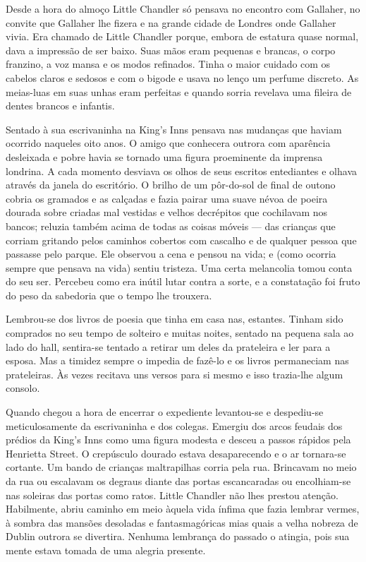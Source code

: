Desde a hora do almoço Little Chandler só pensava no encontro com
Gallaher, no convite que Gallaher lhe fizera e na grande cidade de
Londres onde Gallaher vivia. Era chamado de Little Chandler porque,
embora de estatura quase normal, dava a impressão de ser baixo. Suas
mãos eram pequenas e brancas, o corpo franzino, a voz mansa e os modos
refinados. Tinha o maior cuidado com os cabelos claros e sedosos e com
o bigode e usava no lenço um perfume discreto. As meias-luas em suas
unhas eram perfeitas e quando sorria revelava uma fileira de dentes
brancos e infantis.

Sentado à sua escrivaninha na King's Inns pensava nas mudanças que
haviam ocorrido naqueles oito anos. O amigo que conhecera outrora com
aparência desleixada e pobre havia se
tornado uma figura proeminente da imprensa londrina. A cada momento
desviava os olhos de seus escritos entediantes e olhava através da
janela do escritório. O brilho de um pôr-do-sol de final de outono
cobria os gramados e as calçadas e fazia pairar uma suave névoa de
poeira dourada sobre criadas mal vestidas e velhos decrépitos que
cochilavam nos bancos; reluzia também acima de todas as coisas móveis
--- das crianças que corriam gritando pelos caminhos cobertos com
cascalho e de qualquer pessoa que passasse pelo parque. Ele observou a
cena e pensou na vida; e (como ocorria sempre que pensava na vida)
sentiu tristeza. Uma certa melancolia tomou conta do seu ser. Percebeu
como era inútil lutar contra a sorte, e a constatação foi fruto do
peso da sabedoria que o tempo lhe trouxera.

Lembrou-se dos livros de poesia que tinha em casa nas, estantes.
Tinham sido comprados no seu tempo de solteiro e muitas noites,
sentado na pequena sala ao lado do hall, sentira-se tentado a
retirar um deles da prateleira e ler para a esposa. Mas a timidez
sempre o impedia de fazê-lo e os livros permaneciam nas prateleiras.
Às vezes recitava uns versos para si mesmo e isso trazia-lhe algum
consolo.

Quando chegou a hora de encerrar o expediente levantou-se e
despediu-se meticulosamente da escrivaninha e dos colegas. Emergiu dos
arcos feudais dos prédios da King's Inns como uma figura modesta e
desceu a passos rápidos pela Henrietta Street. O crepúsculo dourado
estava desaparecendo e o ar tornara-se cortante. Um bando de
crianças maltrapilhas corria pela rua. Brincavam no meio da rua ou
escalavam os degraus diante das portas escancaradas ou encolhiam-se
nas soleiras das portas como ratos. Little Chandler não lhes prestou
atenção. Habilmente, abriu caminho em meio àquela vida ínfima que
fazia lembrar vermes, à sombra das mansões desoladas e fantasmagóricas
mias quais a velha nobreza de Dublin outrora se divertira. Nenhuma
lembrança do passado o atingia, pois sua mente estava tomada de uma
alegria presente.

